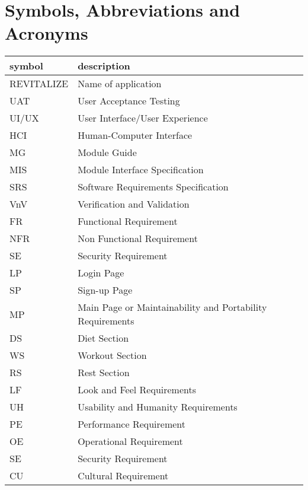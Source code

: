 \documentclass[12pt, titlepage]{article}
\begin{document}
\listoffigures
{}

\newpage

\section{Symbols, Abbreviations and Acronyms}

\renewcommand{\arraystretch}{1.2}
\begin{tabular}{l l} 
	\toprule		
	\textbf{symbol} & \textbf{description}\\
	\midrule 
	REVITALIZE & Name of application\\
	UAT & User Acceptance Testing\\
	UI/UX & User Interface/User Experience\\
	HCI & Human-Computer Interface\\
	MG & Module Guide\\
	MIS & Module Interface Specification\\
	SRS & Software Requirements Specification\\
	VnV & Verification and Validation\\
	FR & Functional Requirement\\
	NFR & Non Functional Requirement\\
	SE & Security Requirement\\
	LP & Login Page\\
	SP & Sign-up Page\\
	MP & Main Page or Maintainability and Portability Requirements\\
	DS & Diet Section\\
	WS & Workout Section\\
	RS & Rest Section\\
	LF & Look and Feel Requirements\\
	UH & Usability and Humanity Requirements\\
	PE & Performance Requirement\\
	OE & Operational Requirement\\
	SE & Security Requirement\\
	CU & Cultural Requirement\\
	\bottomrule
\end{tabular}\\


\newpage
\end{document}
